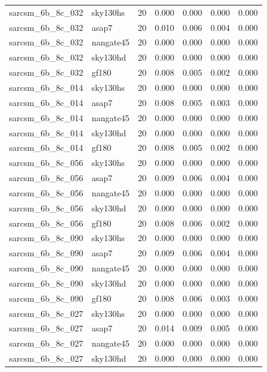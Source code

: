 \begin{tabular}{llrrrrr}
sarcsm\_6b\_8c\_032 & sky130hs & 20 & 0.000 & 0.000 & 0.000 & 0.000 \\
sarcsm\_6b\_8c\_032 & asap7 & 20 & 0.010 & 0.006 & 0.004 & 0.000 \\
sarcsm\_6b\_8c\_032 & nangate45 & 20 & 0.000 & 0.000 & 0.000 & 0.000 \\
sarcsm\_6b\_8c\_032 & sky130hd & 20 & 0.000 & 0.000 & 0.000 & 0.000 \\
sarcsm\_6b\_8c\_032 & gf180 & 20 & 0.008 & 0.005 & 0.002 & 0.000 \\
sarcsm\_6b\_8c\_014 & sky130hs & 20 & 0.000 & 0.000 & 0.000 & 0.000 \\
sarcsm\_6b\_8c\_014 & asap7 & 20 & 0.008 & 0.005 & 0.003 & 0.000 \\
sarcsm\_6b\_8c\_014 & nangate45 & 20 & 0.000 & 0.000 & 0.000 & 0.000 \\
sarcsm\_6b\_8c\_014 & sky130hd & 20 & 0.000 & 0.000 & 0.000 & 0.000 \\
sarcsm\_6b\_8c\_014 & gf180 & 20 & 0.008 & 0.005 & 0.002 & 0.000 \\
sarcsm\_6b\_8c\_056 & sky130hs & 20 & 0.000 & 0.000 & 0.000 & 0.000 \\
sarcsm\_6b\_8c\_056 & asap7 & 20 & 0.009 & 0.006 & 0.004 & 0.000 \\
sarcsm\_6b\_8c\_056 & nangate45 & 20 & 0.000 & 0.000 & 0.000 & 0.000 \\
sarcsm\_6b\_8c\_056 & sky130hd & 20 & 0.000 & 0.000 & 0.000 & 0.000 \\
sarcsm\_6b\_8c\_056 & gf180 & 20 & 0.008 & 0.006 & 0.002 & 0.000 \\
sarcsm\_6b\_8c\_090 & sky130hs & 20 & 0.000 & 0.000 & 0.000 & 0.000 \\
sarcsm\_6b\_8c\_090 & asap7 & 20 & 0.009 & 0.006 & 0.004 & 0.000 \\
sarcsm\_6b\_8c\_090 & nangate45 & 20 & 0.000 & 0.000 & 0.000 & 0.000 \\
sarcsm\_6b\_8c\_090 & sky130hd & 20 & 0.000 & 0.000 & 0.000 & 0.000 \\
sarcsm\_6b\_8c\_090 & gf180 & 20 & 0.008 & 0.006 & 0.003 & 0.000 \\
sarcsm\_6b\_8c\_027 & sky130hs & 20 & 0.000 & 0.000 & 0.000 & 0.000 \\
sarcsm\_6b\_8c\_027 & asap7 & 20 & 0.014 & 0.009 & 0.005 & 0.000 \\
sarcsm\_6b\_8c\_027 & nangate45 & 20 & 0.000 & 0.000 & 0.000 & 0.000 \\
sarcsm\_6b\_8c\_027 & sky130hd & 20 & 0.000 & 0.000 & 0.000 & 0.000 \\

\end{tabular}
